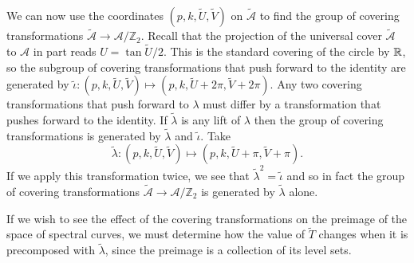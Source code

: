 \documentclass{article}
\begin{document}
We can now use the coordinates $(p,k,\tilde{U},\tilde{V})$ on $\mathcal{\tilde{A}}$ to find the group of covering transformations $\mathcal{\tilde{A}} \to \mathcal{A}/\mathbb{Z}_2$.
Recall that the projection of the universal cover $\mathcal{\tilde{A}}$ to $\mathcal{A}$ in part reads $U = \tan \tilde{U}/2$. This is the standard covering of the circle by $\mathbb{R}$, so the subgroup of covering transformations that push forward to the identity are generated by
$\tilde{\iota}: (p,k,\tilde{U},\tilde{V}) \mapsto (p,k,\tilde{U} + 2\pi ,\tilde{V} +2\pi)$. Any two covering transformations that push forward to $\lambda$ must differ by a transformation that pushes forward to the identity. If $\tilde{\lambda}$ is any lift of $\lambda$ then the group of covering transformations is generated by $\tilde{\lambda}$ and $\tilde{\iota}$. Take
\[
\tilde{\lambda} : (p,k,\tilde{U},\tilde{V}) \mapsto (p,k, \tilde{U} + \pi, \tilde{V} + \pi).
\]
If we apply this transformation twice, we see that $\tilde{\lambda}^2 = \tilde{\iota}$ and so in fact the group of covering transformations $\mathcal{\tilde{A}} \to \mathcal{A}/\mathbb{Z}_2$ is generated by $\tilde{\lambda}$ alone.




If we wish to see the effect of the covering transformations on the preimage of the space of spectral curves, we must determine how the value of $\tilde{T}$ changes when it is precomposed with $\tilde{\lambda}$, since the preimage is a collection of its level sets.
\end{document}
